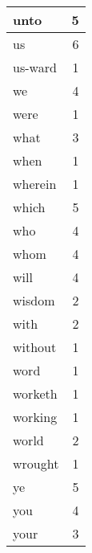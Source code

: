 \begin{center}
\begin{longtable}{l|r}
unto & 5\\ \hline 
us & 6\\ \hline 
us-ward & 1\\ \hline 
we & 4\\ \hline 
were & 1\\ \hline 
what & 3\\ \hline 
when & 1\\ \hline 
wherein & 1\\ \hline 
which & 5\\ \hline 
who & 4\\ \hline 
whom & 4\\ \hline 
will & 4\\ \hline 
wisdom & 2\\ \hline 
with & 2\\ \hline 
without & 1\\ \hline 
word & 1\\ \hline 
worketh & 1\\ \hline 
working & 1\\ \hline 
world & 2\\ \hline 
wrought & 1\\ \hline 
ye & 5\\ \hline 
you & 4\\ \hline 
your & 3\\ \hline 
\end{longtable}  
\end{center}  


  
\normalsize  

  
  
